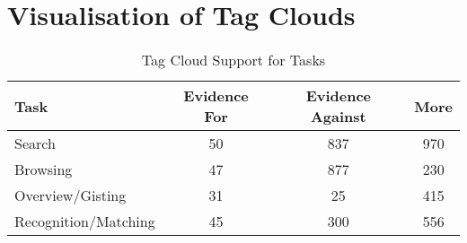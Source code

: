 \chapter{Visualisation of Tag Clouds}
\ifpdf
    \graphicspath{{Chapter3/Chapter3Figs/PNG/}{Chapter3/Chapter3Figs/PDF/}{Chapter3/Chapter3Figs/}}
\else
    \graphicspath{{Chapter3/Chapter3Figs/EPS/}{Chapter3/Chapter3Figs/}}
\fi


\begin{table}[ht]
\caption{Tag Cloud Support for Tasks} 
\centering 
\begin{tabular}{l c c c} %
\hline\hline %
Task & Evidence For & Evidence Against & More \\ [0.5ex]
\hline %
Search & 50 & 837 & 970 \\ %
Browsing & 47 & 877 & 230 \\
Overview/Gisting & 31 & 25 & 415 \\
Recognition/Matching & 45 & 300 & 556 \\ [1ex] %
\hline %
\end{tabular}
\label{table:nonlin} %
\end{table}



